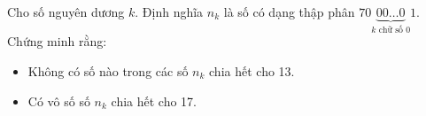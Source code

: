 \ifshowproblem
\begin{problem}\label{example:GER-2015-MO-P4}
	Cho số nguyên dương \( k \). Định nghĩa \( n_k \) là số có dạng thập phân \( 70\underbrace{00\ldots0}_{k \text{ chữ số } 0}1 \).
	Chứng minh rằng:
    \begin{itemize}[topsep=0pt, partopsep=0pt, itemsep=0pt]
        \item Không có số nào trong các số \( n_k \) chia hết cho 13.
        \item Có vô số số \( n_k \) chia hết cho 17.
    \end{itemize}
\end{problem}
\fi

\footnotemark
{}
\fi